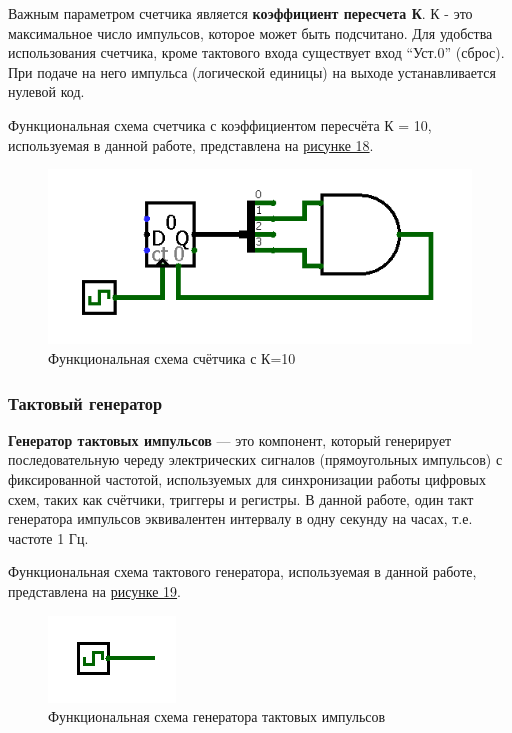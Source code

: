 \documentclass[11pt,a4paper,final]{article} %
\begin{document}
Важным параметром счетчика является \textbf{коэффициент пересчета К}. К - это максимальное число импульсов, 
которое может быть подсчитано. Для удобства использования счетчика, кроме тактового входа существует вход 
“Уст.0” (сброс). При подаче на него импульса (логической единицы) на выходе устанавливается нулевой 
код. 


Функциональная схема счетчика с коэффициентом пересчёта К = 10, используемая в данной работе, представлена на 
\hyperref[fig:IC2]{рисунке 18}.

\begin{figure}[H]
	\centering
	\includegraphics[width=0.68 \linewidth]{img/counter.png}
	\caption{Функциональная схема счётчика с К=10}
	\label{fig:counter}
\end{figure}


\subsubsection{Тактовый генератор}

\textbf{Генератор тактовых импульсов} — это компонент, который генерирует последовательную череду электрических сигналов (прямоугольных импульсов) с фиксированной частотой, используемых для синхронизации работы цифровых схем, таких как счётчики, триггеры и регистры. В данной работе, один такт генератора импульсов эквивалентен интервалу в одну секунду на часах, т.е. частоте 1 Гц. 

Функциональная схема тактового генератора, используемая в данной работе, представлена на \hyperref[fig:gen]{рисунке 19}.

\begin{figure}[H]
	\centering
	\includegraphics[width=0.25 \linewidth]{img/gen.png}
	\caption{Функциональная схема генератора тактовых импульсов}
	\label{fig:gen}
\end{figure}
\end{document}
